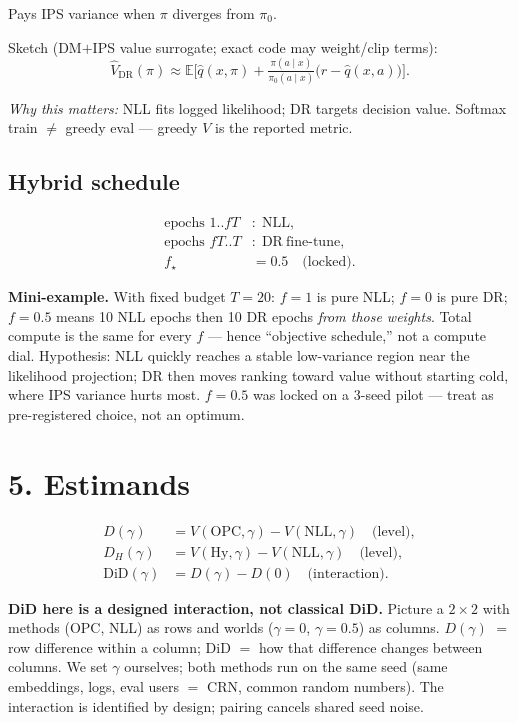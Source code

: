 \documentclass[11pt]{article}
\newcommand{\phonesection}[1]{\Needspace{8\baselineskip}\section*{#1}}
\newcommand{\phonesub}[1]{\Needspace{6\baselineskip}\subsection*{#1}}
\newcommand{\why}[1]{\par{\footnotesize\color{blue!35!black}\textit{Why this matters:} #1\par}}
\newcommand{\miniex}[1]{\par{\footnotesize\color{black!70}\textbf{Mini-example.} #1\par}}
\begin{document}
Pays IPS variance when $\pi$ diverges from
$\pi_{0}$.

Sketch (DM$+$IPS value surrogate; exact
code may weight/clip terms):
\begin{equation*}
\widehat{V}_{\mathrm{DR}}(\pi)
  \approx \mathbb{E}\Big[
    \hat q(x,\pi)
    + \tfrac{\pi(a\mid x)}{\pi_{0}(a\mid x)}
      \big(r-\hat q(x,a)\big)
  \Big].
\end{equation*}
\why{NLL fits logged likelihood; DR targets
decision value. Softmax train $\ne$ greedy
eval --- greedy $V$ is the reported metric.}

\phonesub{Hybrid schedule}
\begin{align*}
\text{epochs }1..fT &:\;\mathrm{NLL},\\
\text{epochs }fT..T &:\;\mathrm{DR\ fine\text{-}tune},\\
f_{\star} &= 0.5\quad\text{(locked)}.
\end{align*}

\miniex{With fixed budget $T{=}20$: $f{=}1$
is pure NLL; $f{=}0$ is pure DR; $f{=}0.5$
means 10 NLL epochs then 10 DR epochs
\emph{from those weights}.  Total compute
is the same for every $f$ --- hence
``objective schedule,'' not a compute dial.
Hypothesis: NLL quickly reaches a stable
low-variance region near the likelihood
projection; DR then moves ranking toward
value without starting cold, where IPS
variance hurts most.  $f{=}0.5$ was locked
on a 3-seed pilot --- treat as
pre-registered choice, not an optimum.}

\phonesection{5. Estimands}

\begin{align*}
D(\gamma)
  &= V(\mathrm{OPC},\gamma)
   - V(\mathrm{NLL},\gamma)
   \quad\text{(level)},\\
D_{H}(\gamma)
  &= V(\mathrm{Hy},\gamma)
   - V(\mathrm{NLL},\gamma)
   \quad\text{(level)},\\
\mathrm{DiD}(\gamma)
  &= D(\gamma)-D(0)
   \quad\text{(interaction)}.
\end{align*}

\textbf{DiD here is a designed interaction,
not classical DiD.}  Picture a $2\times 2$
with methods (OPC, NLL) as rows and worlds
($\gamma{=}0$, $\gamma{=}0.5$) as columns.
$D(\gamma)$ $=$ row difference within a
column; DiD $=$ how that difference changes
between columns.  We set $\gamma$ ourselves;
both methods run on the same seed (same
embeddings, logs, eval users $=$ CRN,
common random numbers).  The
interaction is identified by design; pairing
cancels shared seed noise.
\end{document}
